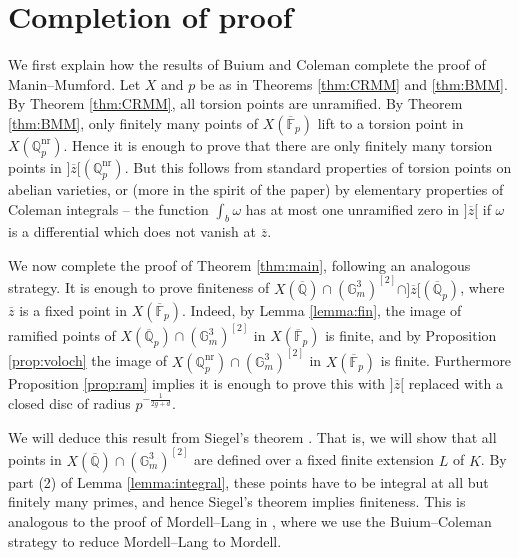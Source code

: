 \documentclass{amsart}
\def\Q{\mathbb Q}
\theoremstyle{definition}
\newcommand{\F}{\mathbb{F}}
\begin{document}
\section{Completion of proof}
We first explain how the results of Buium and Coleman complete the proof of Manin--Mumford. Let $X$ and $p$ be as in Theorems \ref{thm:CRMM} and \ref{thm:BMM}. By Theorem \ref{thm:CRMM}, all torsion points are unramified. By Theorem \ref{thm:BMM}, only finitely many points of $X(\overline{\F }_p )$ lift to a torsion point in $X(\Q _p ^{\mathrm{nr}})$. Hence it is enough to prove that there are only finitely many torsion points in $]\overline{z}[(\Q _p ^{\mathrm{nr}})$. But this follows from standard properties of torsion points on abelian varieties, or (more in the spirit of the paper) by elementary properties of Coleman integrals -- the function $\int _b \omega $ has at most one unramified zero in $]\overline{z}[$ if $\omega $ is a differential which does not vanish at $\overline{z}$.

We now complete the proof of Theorem \ref{thm:main}, following an analogous strategy. It is enough to prove finiteness of $X(\overline{\Q }) \cap (\mathbb{G}_m ^3 )^{[2]}\cap ]\overline{z}[(\overline{\Q }_p )$, where $\overline{z}$ is a fixed point in $X(\overline{\F }_p )$. Indeed, by Lemma \ref{lemma:fin}, the image of ramified points of $X(\overline{\Q }_p )\cap (\mathbb{G}_m ^3 )^{[2]}$ in $X(\overline{\F }_p )$ is finite, and by Proposition \ref{prop:voloch} the image of $X(\Q_p ^{\mathrm{nr}})\cap (\mathbb{G}_m ^3 )^{[2]}$ in $X(\overline{\F }_p )$ is finite. Furthermore Proposition \ref{prop:ram} implies it is enough to prove this with $]\overline{z}[$ replaced with a closed disc of radius $p^{-\frac{1}{2g+d}}$.

We will deduce this result from Siegel's theorem \cite{siegel}. That is, we will show that all points in $X(\overline{\Q })\cap (\mathbb{G}_m ^3 )^{[2]}$ are defined over a fixed finite extension $L$ of $K$. By part (2) of Lemma \ref{lemma:integral}, these points have to be integral at all but finitely many primes, and hence Siegel's theorem implies finiteness. This is analogous to the proof of Mordell--Lang in \cite{DP}, where we use the Buium--Coleman strategy to reduce Mordell--Lang to Mordell.
\end{document}
